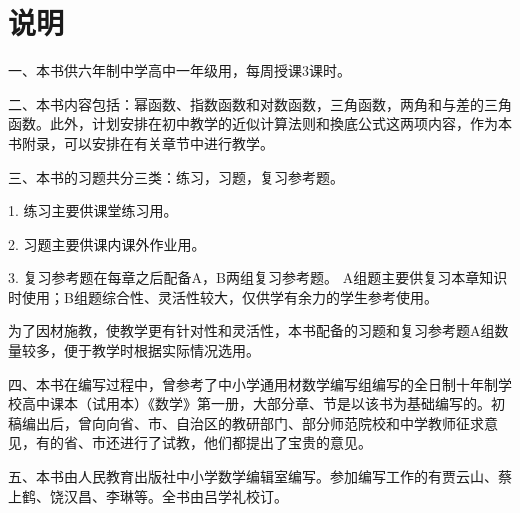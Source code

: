 
\chapter{说明}

一、本书供六年制中学高中一年级用，每周授课3课时。

二、本书内容包括：幂函数、指数函数和对数函数，三角函数，两角和与差的三角函数。此外，计划安排在初中教学的近似计算法则和換底公式这两项内容，作为本书附录，可以安排在有关章节中进行教学。

三、本书的习题共分三类：练习，习题，复习参考题。

1. 练习\quad 主要供课堂练习用。

2. 习题\quad 主要供课内课外作业用。

3. 复习参考题\quad 在每章之后配备A，B两组复习参考题。
A组题主要供复习本章知识时使用；B组题综合性、灵活性较大，仅供学有余力的学生参考使用。

为了因材施教，使教学更有针对性和灵活性，本书配备的习题和复习参考题A组数量较多，便于教学时根据实际情况选用。

四、本书在编写过程中，曾参考了中小学通用材数学编写组编写的全日制十年制学校高中课本（试用本）《数学》第一册，大部分章、节是以该书为基础编写的。初稿编出后，曾向向省、市、自治区的教研部门、部分师范院校和中学教师征求意见，有的省、市还进行了试教，他们都提出了宝贵的意见。

五、本书由人民教育出版社中小学数学编辑室编写。参加编写工作的有贾云山、蔡上鹤、饶汉昌、李琳等。全书由吕学礼校订。
